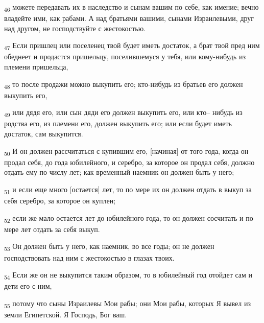 \begin{tcolorbox}
\textsubscript{46} можете передавать их в наследство и сынам вашим по себе, как имение; вечно владейте ими, как рабами. А над братьями вашими, сынами Израилевыми, друг над другом, не господствуйте с жестокостью.
\end{tcolorbox}
\begin{tcolorbox}
\textsubscript{47} Если пришлец или поселенец твой будет иметь достаток, а брат твой пред ним обеднеет и продастся пришельцу, поселившемуся у тебя, или кому-нибудь из племени пришельца,
\end{tcolorbox}
\begin{tcolorbox}
\textsubscript{48} то после продажи можно выкупить его; кто-нибудь из братьев его должен выкупить его,
\end{tcolorbox}
\begin{tcolorbox}
\textsubscript{49} или дядя его, или сын дяди его должен выкупить его, или кто-- нибудь из родства его, из племени его, должен выкупить его; или если будет иметь достаток, сам выкупится.
\end{tcolorbox}
\begin{tcolorbox}
\textsubscript{50} И он должен рассчитаться с купившим его, [начиная] от того года, когда он продал себя, до года юбилейного, и серебро, за которое он продал себя, должно отдать ему по числу лет; как временный наемник он должен быть у него;
\end{tcolorbox}
\begin{tcolorbox}
\textsubscript{51} и если еще много [остается] лет, то по мере их он должен отдать в выкуп за себя серебро, за которое он куплен;
\end{tcolorbox}
\begin{tcolorbox}
\textsubscript{52} если же мало остается лет до юбилейного года, то он должен сосчитать и по мере лет отдать за себя выкуп.
\end{tcolorbox}
\begin{tcolorbox}
\textsubscript{53} Он должен быть у него, как наемник, во все годы; он не должен господствовать над ним с жестокостью в глазах твоих.
\end{tcolorbox}
\begin{tcolorbox}
\textsubscript{54} Если же он не выкупится таким образом, то в юбилейный год отойдет сам и дети его с ним,
\end{tcolorbox}
\begin{tcolorbox}
\textsubscript{55} потому что сыны Израилевы Мои рабы; они Мои рабы, которых Я вывел из земли Египетской. Я Господь, Бог ваш.
\end{tcolorbox}
